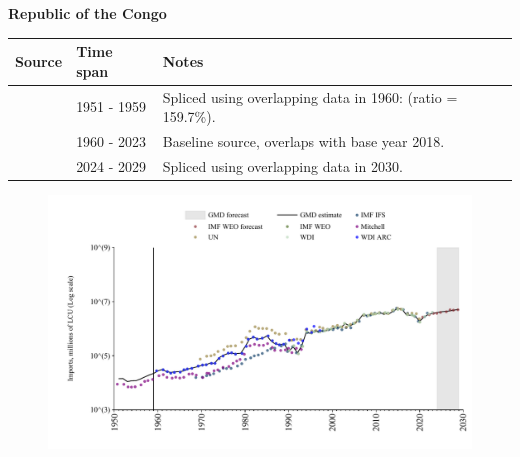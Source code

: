 \documentclass[12pt,a4paper,landscape]{article}
\begin{document}
\begin{adjustbox}{max totalsize={\paperwidth}{\paperheight},center}
\begin{minipage}[t][\textheight][t]{\textwidth}
\vspace*{0.5cm}
{}
\begin{center}
{\Large\bfseries Republic of the Congo}
\end{center}
\vspace{0.5cm}
\begin{table}[H]
\centering
\small
\begin{tabular}{|l|l|l|}
\hline
\textbf{Source} & \textbf{Time span} & \textbf{Notes} \\
\hline
\rowcolor{white}\cite{Mitchell}& 1951 - 1959 &Spliced using overlapping data in 1960: (ratio = 159.7\%).\\
\rowcolor{lightgray}\cite{WDI}& 1960 - 2023 &Baseline source, overlaps with base year 2018.\\
\rowcolor{white}\cite{IMF_WEO_forecast}& 2024 - 2029 &Spliced using overlapping data in 2030.\\
\hline
\end{tabular}
\end{table}
\begin{figure}[H]
\centering
\includegraphics[width=\textwidth,height=0.6\textheight,keepaspectratio]{graphs/COG_imports.pdf}
\end{figure}
\end{minipage}
\end{adjustbox}
\end{document}
